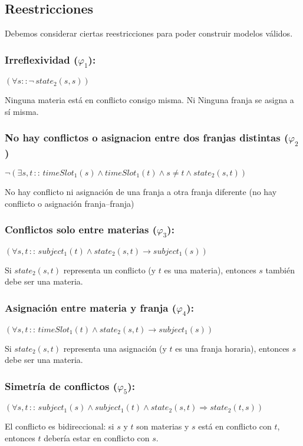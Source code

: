 \documentclass[a4paper,11pt]{article}
\begin{document}
\newpage

\subsection{Reestricciones}
Debemos considerar ciertas reestricciones para poder construir modelos válidos.


\subsubsection{Irreflexividad ($\varphi_1$):}
\begin{center}
    $(\forall s :: \neg \, state_2(s, s))$
\end{center}
Ninguna materia está en conflicto consigo misma. Ni Ninguna franja se asigna a sí misma.
\subsubsection{No hay conflictos o asignacion entre dos franjas distintas ($\varphi_2$)}
\begin{center}
    $\neg(\exists s, t \,::\, timeSlot_1(s) \land timeSlot_1(t) \land s \neq t \land state_2(s, t))$ \\
\end{center}
No hay conflicto ni asignación de una franja a otra franja diferente (no hay conflicto o asignación franja–franja)

\subsubsection{Conflictos solo entre materias ($\varphi_3$):}
\begin{center}
    $(\forall s, t \,::\, subject_1(t) \land state_2(s,t) \rightarrow subject_1(s))$
\end{center}
Si $state_2(s,t)$ representa un conflicto (y $t$ es una materia), entonces $s$ también debe ser una materia.

\subsubsection{Asignación entre materia y franja ($\varphi_4$):}
\begin{center}
    $(\forall s, t \,::\, timeSlot_1(t) \land state_2(s,t) \rightarrow subject_1(s))$
\end{center}
Si $state_2(s,t)$ representa una asignación (y $t$ es una franja horaria), entonces $s$ debe ser una materia.

\subsubsection{Simetría de conflictos ($\varphi_5$):}
\begin{center}
    $(\forall s, t \,::\, subject_1(s) \land subject_1(t) \land state_2(s, t) \Rightarrow state_2(t, s))$
\end{center}
El conflicto es bidireccional: si $s$ y $t$ son materias y $s$ está en conflicto con $t$, entonces $t$ debería estar en conflicto con $s$.
\end{document}
